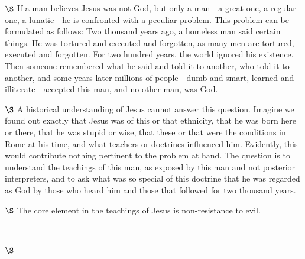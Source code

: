 \documentclass[a4paper, 12pt]{article}
\begin{document}
$\S$ If a man believes Jesus was not God, but only a man---a great one, a
regular one, a lunatic---he is confronted with a peculiar problem. This problem
can be formulated as follows: Two thousand years ago, a homeless man said
certain things. He was tortured and executed and forgotten, as many men are
tortured, executed and forgotten. For two hundred years, the world ignored his
existence. Then someone remembered what he said and told it to another, who told
it to another, and some years later millions of people---dumb and smart, learned
and illiterate---accepted this man, and no other man, was God. 

$\S$ A historical understanding of Jesus cannot answer this question. Imagine we
found out exactly that Jesus was of this or that ethnicity, that he was born
here or there, that he was stupid or wise, that these or that were the
conditions in Rome at his time, and what teachers or doctrines influenced him.
Evidently, this would contribute nothing pertinent to the problem at hand. The
question is to understand the teachings of this man, as exposed by this man and
not posterior interpreters, and to ask what was so special of this doctrine that
he was regarded as God by those who heard him and those that followed for two
thousand years.

$\S$ The core element in the teachings of Jesus is non-resistance to evil.

--- 

$\S$
\end{document}
